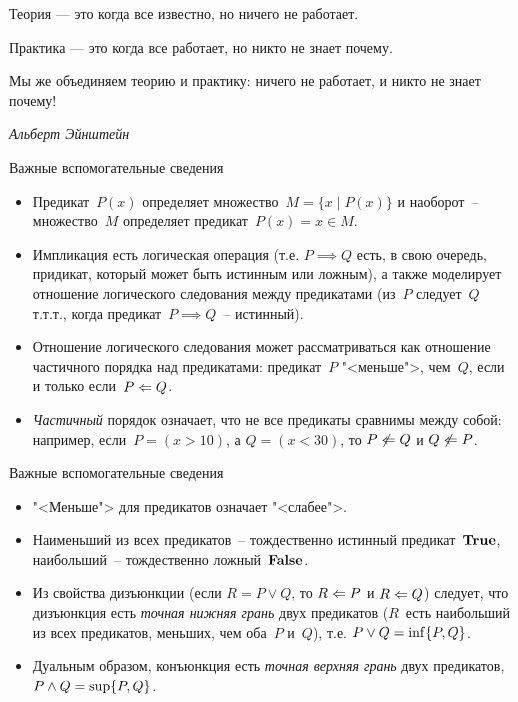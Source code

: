 \documentclass[landscape]{slides}
\begin{document}
\begin{slide}
\begin{Large}
Теория — это когда все известно, но ничего не работает.

Практика — это когда все работает, но никто не знает почему.

Мы же объединяем теорию и практику: ничего не работает, и никто не знает почему!
\end{Large}

\begin{flushright}
\emph{Альберт Эйнштейн}
\end{flushright}
\end{slide}

\begin{slide}
    Важные вспомогательные сведения
    \begin{itemize}
        \item Предикат~$P(x)$ определяет множество~$M=\{x\mid P(x)\}$ и наоборот~-- множество~$M$ определяет предикат~$P(x) = x\in M$.
        \item Импликация есть логическая операция (т.е. $P\implies Q$ есть, в свою очередь, придикат, который может быть истинным или ложным), а также моделирует отношение логического следования между предикатами (из~$P$ следует~$Q$ т.т.т., когда предикат~$P\implies Q$~-- истинный).
        \item Отношение логического следования может рассматриваться как отношение частичного порядка над предикатами: предикат~$P$ "<меньше">, чем~$Q$, если и только если~$P\Leftarrow Q$.
        \item \emph{Частичный} порядок означает, что не все предикаты сравнимы между собой: например, если~$P=(x>10)$, а $Q=(x<30)$, то $P\not\Leftarrow Q$ и $Q\not\Leftarrow P$.
    \end{itemize}
\end{slide}

\begin{slide}
    Важные вспомогательные сведения
    \begin{itemize}
            \item "<Меньше"> для предикатов означает "<слабее">.
            \item Наименьший из всех предикатов~-- тождественно истинный предикат~$\mathbf{True}$, наибольший~-- тождественно ложный~$\mathbf{False}$.
            \item Из свойства дизъюнкции (если $R=P\lor Q$, то $R\Leftarrow P$ и $R\Leftarrow Q$) следует, что дизъюнкция есть \emph{точная нижняя грань} двух предикатов ($R$~есть наибольший из всех предикатов, меньших, чем оба~$P$ и~$Q$), т.е. $P\lor Q = \mathrm{inf}\{P, Q\}$.
            \item Дуальным образом, конъюнкция есть \emph{точная верхняя грань} двух предикатов, $P\land Q = \mathrm{sup}\{P, Q\}$.
    \end{itemize}
\end{slide}
\end{document}
